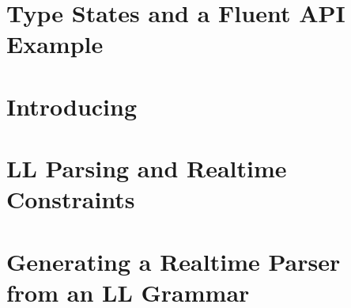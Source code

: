 \section{Type States and a Fluent API Example}
\label{section:example}


\section{Introducing \Fajita}
\label{section:fajita}


\section{LL Parsing and Realtime Constraints}
\label{section:intuition}


\section{Generating a Realtime Parser \\ from an LL Grammar}
\label{section:algorithm}

